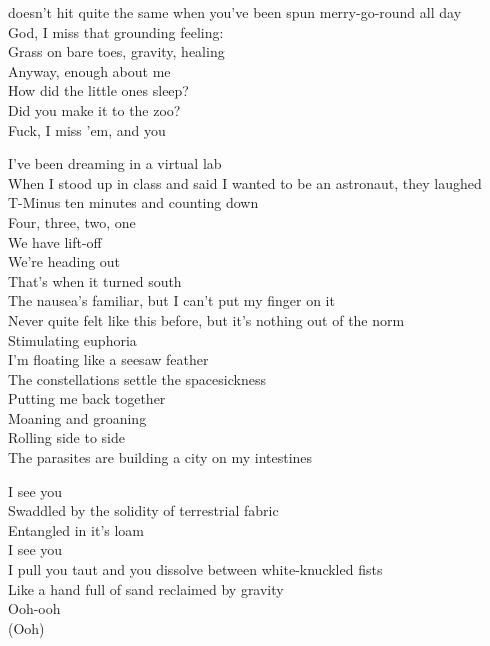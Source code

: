  doesn't hit quite the same when you've been spun merry-go-round all day \\
God, I miss that grounding feeling: \\
Grass on bare toes, gravity, healing \\
Anyway, enough about me \\
How did the little ones sleep? \\
Did you make it to the zoo? \\
Fuck, I miss 'em, and you \\


I've been dreaming in a virtual lab \\
When I stood up in class and said I wanted to be an astronaut, they laughed \\
T-Minus ten minutes and counting down \\
Four, three, two, one \\
We have lift-off \\
We're heading out \\
That's when it turned south \\

The nausea's familiar, but I can't put my finger on it \\
Never quite felt like this before, but it's nothing out of the norm \\
Stimulating euphoria \\
I'm floating like a seesaw feather \\
The constellations settle the spacesickness \\
Putting me back together \\

Moaning and groaning \\
Rolling side to side \\
The parasites are building a city on my intestines \\


I see you \\
Swaddled by the solidity of terrestrial fabric \\
Entangled in it's loam \\
I see you \\
I pull you taut and you dissolve between white-knuckled fists \\
Like a hand full of sand reclaimed by gravity \\
Ooh-ooh \\
(Ooh) \\

